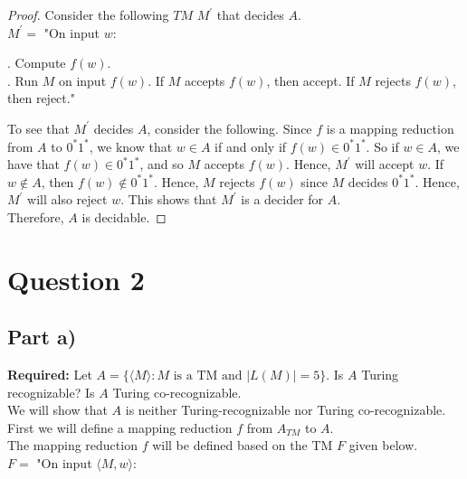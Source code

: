 \documentclass[12pt]{article}
\begin{document}
\begin{proof}
Consider the following $TM$ $M^\prime$ that decides $A$. \\

$M^\prime = $ "On input $w$: \\

\setlength\parindent{15pt}

. Compute $f(w)$. \\

. Run $M$ on input $f(w)$. If $M$ accepts $f(w)$, then accept. If $M$ rejects $f(w)$, then reject." \\

\setlength\parindent{0pt}

To see that $M^\prime$ decides $A$, consider the following. Since $f$ is a mapping reduction from $A$ to $0^*1^*$, we know that $w \in A$ if and only if $f(w) \in 0^*1^*$. So if $w \in A$, we have that $f(w) \in 0^*1^*$, and so $M$ accepts $f(w)$. Hence, $M^\prime$ will accept $w$. If $w \not \in A$, then $f(w) \not \in 0^*1^*$. Hence, $M$ rejects $f(w)$ since $M$ decides $0^*1^*$. Hence, $M^\prime$ will also reject $w$. This shows that $M^\prime$ is a decider for $A$. \\

Therefore, $A$ is decidable. 
\end{proof}

\newpage

\section*{Question 2}

\subsection*{Part a)}

\textbf{Required:} Let $A = \{\langle M \rangle : \text{$M$ is a TM and } |L(M)| = 5\}$. Is $A$ Turing recognizable? Is $A$ Turing co-recognizable. \\

We will show that $A$ is neither Turing-recognizable nor Turing co-recognizable. \\

First we will define a mapping reduction $f$ from $A_{TM}$ to $A$. \\

The mapping reduction $f$ will be defined based on the TM $F$ given below. \\

$F = $ "On input $\langle M, w \rangle$: \\
\end{document}
